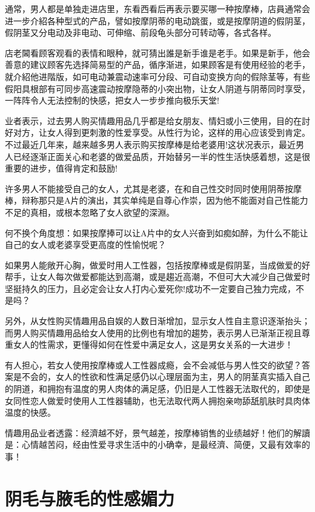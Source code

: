 \documentclass[12pt,UTF8]{ctexbook}
\begin{document}
通常，男人都是单独走进店里，东看西看后再表示要买哪一种按摩棒，店員通常会进一步介紹各种型式的产品，譬如按摩阴蒂的电动跳蛋，或是按摩阴道的假阴茎，假阴茎又分电动及非电动、可伸缩、前段龟头部分可转动等，各式各样。

店老閪看顾客观看的表情和眼种，就可猜出誰是新手谁是老手。如果是新手，他会善意的建议顾客先选择简易型的产品，循序渐进，如果顾客是有使用经验的老手，就介紹他进階版，如可电动兼震动速率可分段、可自动变换方向的假除茎等，有些假阳具根部有可同步高速震动按摩隐蒂的小突出物，让女人阴道与阴蒂同时享受，一阵阵令人无法控制的快感，把女人一步步推向极乐天堂!

业者表示，过去男人购买情趣用品几乎都是给女朋友、情妇或小三使用，目的在討好对方，让女人得到更刺激的性爱享受。从性行为论，这样的用心应该受到肯定。不过最近几年来，越来越多男人表示购买按摩棒是给老婆用!这状况表示，最近男人已经逐渐正面关心和老婆的做爱品质，开始替另一半的性生活快感着想，这是很重要的进步，值得肯定和鼓励!

许多男人不能接受自己的女人，尤其是老婆，在和自己性交时同时使用阴蒂按摩棒，辩称那只是A片的演出，其实单纯是自尊心作崇，因为他不能面对自己性能力不足的真相，或根本忽略了女人欲望的深淵。

何不换个角度想：如果按摩捧可以让A片中的女人兴奋到如痴如醉，为什么不能让自己的女人或老婆享受更高度的性愉悦呢？

如果男人能敞开心胸，做爱时用人工性器，包括按摩棒或是假阴茎，当成做爱的好帮手，让女人每次做爱都能达到高潮，或是趨近高潮，不但可大大减少自己做爱时坚挺持久的压力，且必定会让女人打内心爱死你!成功不一定要自己独力完成，不是吗？

另外，从女性购买情趣用品自娱的人数日渐增加，显示女人性自主意识逐渐抬头；而男人购买情趣用品给女人使用的比例也有增加的趨势，表示男人已渐渐正视且尊重女人的性需求，更懂得如何在性爱中满足女人，这是男女关系的一大进步！

有人担心，若女人使用按摩棒或人工性器成瘾，会不会减低与男人性交的欲望？答案是不会的，女人的性欲和性满足感仍以心理层面为主，男人的阴茎真实插入自己的阴道，和拥抱有温度的男人肉体的满足感，仍旧是人工性器无法取代的，即使是女同性恋人做爱时使用人工性器辅助，也无法取代两人拥抱亲吻舔舐肌肤时具肉体温度的快感。

情趣用品业者透露：经濟越不好，景气越差，按摩棒销售的业绩越好！他们的解讀是：心情越苦闷，经由性爱寻求生活中的小确幸，是最经濟、简便，又最有效率的事！

\chapter{阴毛与腋毛的性感媚力}
\end{document}
